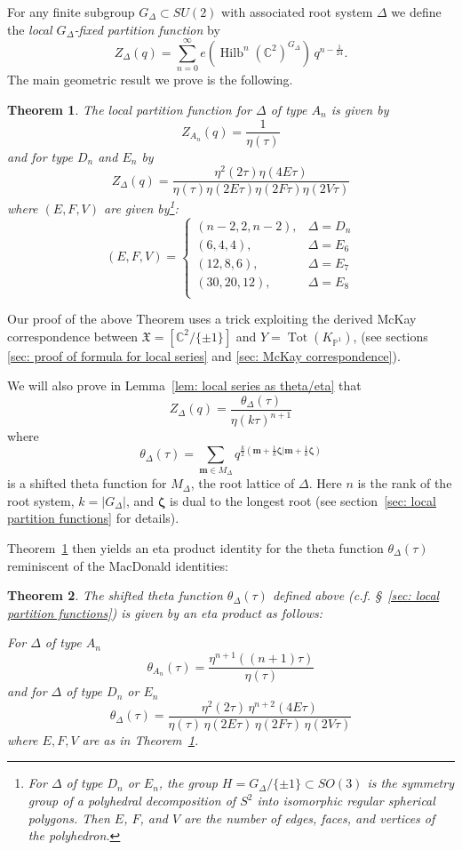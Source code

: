\documentclass{amsart}
\newtheorem{theorem}{Theorem}[section]
\theoremstyle{definition}
\newcommand{\CC} {{\mathbb C}}          %
\newcommand{\PP}{\mathbb{P}}
\newcommand{\X}{\mathfrak{X}}
\newcommand{\mvec}{\bm{m}}
\newcommand{\zetavec}{\bm{\zeta }}
\newcommand{\Hilb}{\operatorname{Hilb}}
\begin{document}
For any finite subgroup $G_{\Delta}\subset SU(2)$ with associated root
system $\Delta$ we define the \emph{local $G_{\Delta }$-fixed
partition function} by
\[
Z_{\Delta} (q) = \sum_{n=0}^{\infty}
e\left(\Hilb^{n}(\CC^{2})^{G_{\Delta}} \right) \, q^{n-\frac{1}{24}} .
\]
The main geometric result we prove is the following. 
\begin{theorem}\label{thm: formula for local series (in intro)}
The local partition function for $\Delta$ of type $A_{n}$ is given by 
\[
Z_{A_{n}}(q) = \frac{1}{\eta (\tau )}
\]
and for type $D_{n}$ and $E_{n}$ by
\[
Z_{\Delta}(q) = \frac{\eta^{2}(2\tau )\eta (4E\tau )}{\eta (\tau )\eta (2E\tau )\eta (2F\tau )\eta (2V\tau )}
\]
where $(E,F,V)$ are given by\footnote{For $\Delta$ of type
$D_{n}$ or $E_{n}$, the group $H = G_{\Delta}/\{\pm 1 \}\subset SO(3)$
is the symmetry group of a polyhedral decomposition of $S^{2}$ into
isomorphic regular spherical polygons. Then $E$, $F$, and $V$ are the
number of edges, faces, and vertices of the polyhedron.}:
\[
(E,F,V) = \begin{cases}
(n-2,2,n-2), & \Delta =D_{n}\\
(6,4,4), & \Delta =E_{6}\\
(12,8,6), & \Delta =E_{7}\\
(30,20,12), & \Delta =E_{8}\\
\end{cases}
\]
\end{theorem}
Our proof of the above Theorem uses a trick exploiting the derived
McKay correspondence between $\X =[\CC^{2}/\{\pm 1 \}]$ and
$Y=\operatorname{Tot}(K_{\PP^{1}})$, (see sections \ref{sec: proof of
formula for local series} and \ref{sec: McKay correspondence}).




We will also prove in Lemma~\ref{lem: local series as theta/eta}  that
\[
Z_{\Delta}(q) =\frac{\theta_{\Delta}(\tau)}{\eta (k\tau )^{n+1}}
\]
where 
\[
\theta_{\Delta}(\tau ) = \sum_{\mvec \in M_{\Delta}}
q^{\frac{k}{2}\left(\mvec +\frac{1}{k}\zetavec |\mvec
+\frac{1}{k}\zetavec \right)}
\]
is a shifted theta function for $M_{\Delta} $, the root lattice of
$\Delta$. Here $n$ is the rank of the root system, $k=|G_{\Delta}|$, and
$\zetavec$ is dual to the longest root (see section~\ref{sec: local
partition functions} for details).

Theorem~\ref{thm: formula for local series (in intro)} then yields an
eta product identity for the theta function $\theta_{\Delta}(\tau )$
reminiscent of the MacDonald identities:
\begin{theorem}\label{thm: eta product for theta function}
The shifted theta function $\theta _{\Delta}(\tau )$ defined above
(c.f. \S~\ref{sec: local partition functions}) is given by an eta
product as follows:

For $\Delta$ of type $A_{n}$
\[
\theta_{A_{n}} (\tau ) = \frac{\eta^{n+1} ((n+1)\tau )}{\eta (\tau )}
\]
and for $\Delta$ of type $D_{n}$ or $E_{n}$ 
\[
\theta_{\Delta}(\tau ) = \frac{\eta^{2}(2\tau )\,\eta ^{n+2}(4E\tau
)}{\eta (\tau )\, \eta (2E\tau )\,\eta (2F\tau )\,\eta (2V\tau )}
\]
where $E,F,V$ are as in Theorem~\ref{thm: formula for local series (in intro)}.
\end{theorem}
\end{document}
